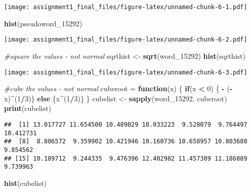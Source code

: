 \documentclass[
]{article}
\newenvironment{Shaded}{\begin{snugshade}}{\end{snugshade}}
\newcommand{\CommentTok}[1]{\textcolor[rgb]{0.56,0.35,0.01}{\textit{#1}}}
\newcommand{\ControlFlowTok}[1]{\textcolor[rgb]{0.13,0.29,0.53}{\textbf{#1}}}
\newcommand{\DecValTok}[1]{\textcolor[rgb]{0.00,0.00,0.81}{#1}}
\newcommand{\FunctionTok}[1]{\textcolor[rgb]{0.13,0.29,0.53}{\textbf{#1}}}
\newcommand{\NormalTok}[1]{#1}
\newcommand{\OtherTok}[1]{\textcolor[rgb]{0.56,0.35,0.01}{#1}}
\newcommand{\SpecialCharTok}[1]{\textcolor[rgb]{0.81,0.36,0.00}{\textbf{#1}}}
\begin{document}
\texttt{[image: assignment1\_final\_files/figure-latex/unnamed-chunk-6-1.pdf]}

\begin{Shaded}
\begin{Highlighting}[]
\FunctionTok{hist}\NormalTok{(pseudoword\_15292)}
\end{Highlighting}
\end{Shaded}

\texttt{[image: assignment1\_final\_files/figure-latex/unnamed-chunk-6-2.pdf]}

\begin{Shaded}
\begin{Highlighting}[]
\CommentTok{\#square the values {-} not normal}
\NormalTok{sqrthist }\OtherTok{\textless{}{-}} \FunctionTok{sqrt}\NormalTok{(word\_15292)}
\FunctionTok{hist}\NormalTok{(sqrthist)}
\end{Highlighting}
\end{Shaded}

\texttt{[image: assignment1\_final\_files/figure-latex/unnamed-chunk-6-3.pdf]}

\begin{Shaded}
\begin{Highlighting}[]
\CommentTok{\#cube the values {-} not normal}
\NormalTok{cuberoot }\OtherTok{=} \ControlFlowTok{function}\NormalTok{(x) \{ }
     \ControlFlowTok{if}\NormalTok{(x }\SpecialCharTok{\textless{}} \DecValTok{0}\NormalTok{)}
\NormalTok{    \{ }\SpecialCharTok{{-}}\NormalTok{ (}\SpecialCharTok{{-}}\NormalTok{x)}\SpecialCharTok{\^{}}\NormalTok{(}\DecValTok{1}\SpecialCharTok{/}\DecValTok{3}\NormalTok{)\}}
    \ControlFlowTok{else}
\NormalTok{    \{x}\SpecialCharTok{\^{}}\NormalTok{(}\DecValTok{1}\SpecialCharTok{/}\DecValTok{3}\NormalTok{)\}}
\NormalTok{    \}}
\NormalTok{cubelist }\OtherTok{\textless{}{-}} \FunctionTok{sapply}\NormalTok{(word\_15292, cuberoot) }
\FunctionTok{print}\NormalTok{(cubelist)}
\end{Highlighting}
\end{Shaded}

\begin{verbatim}
##  [1] 13.017727 11.654500 10.489029 10.033223  9.528079  9.764497 10.412731
##  [8]  8.806572  9.359902 10.421946 10.160736 10.658957 10.803680  9.854562
## [15] 10.189712  9.244335  9.476396 12.402982 11.457309 11.186889  9.739963
\end{verbatim}

\begin{Shaded}
\begin{Highlighting}[]
\FunctionTok{hist}\NormalTok{(cubelist)}
\end{Highlighting}
\end{Shaded}
\end{document}
